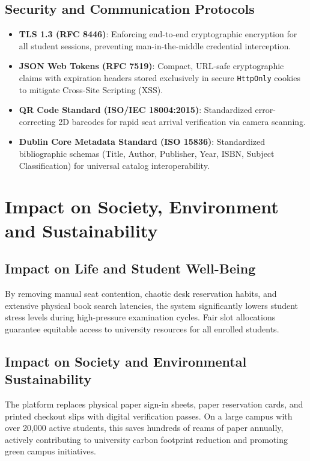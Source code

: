 \subsection{Security and Communication Protocols}
\begin{itemize}
    \item \textbf{TLS 1.3 (RFC 8446)}: Enforcing end-to-end cryptographic encryption for all student sessions, preventing man-in-the-middle credential interception.
    \item \textbf{JSON Web Tokens (RFC 7519)}: Compact, URL-safe cryptographic claims with expiration headers stored exclusively in secure \texttt{HttpOnly} cookies to mitigate Cross-Site Scripting (XSS).
    \item \textbf{QR Code Standard (ISO/IEC 18004:2015)}: Standardized error-correcting 2D barcodes for rapid seat arrival verification via camera scanning.
    \item \textbf{Dublin Core Metadata Standard (ISO 15836)}: Standardized bibliographic schemas (Title, Author, Publisher, Year, ISBN, Subject Classification) for universal catalog interoperability.
\end{itemize}

\section{Impact on Society, Environment and Sustainability}

\subsection{Impact on Life and Student Well-Being}
By removing manual seat contention, chaotic desk reservation habits, and extensive physical book search latencies, the system significantly lowers student stress levels during high-pressure examination cycles. Fair slot allocations guarantee equitable access to university resources for all enrolled students.

\subsection{Impact on Society and Environmental Sustainability}
The platform replaces physical paper sign-in sheets, paper reservation cards, and printed checkout slips with digital verification passes. On a large campus with over 20,000 active students, this saves hundreds of reams of paper annually, actively contributing to university carbon footprint reduction and promoting green campus initiatives.

